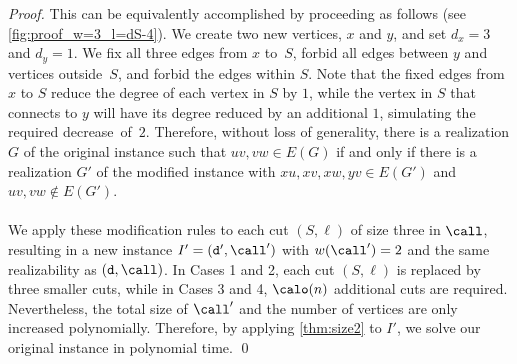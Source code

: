 \begin{proof}
    This can be equivalently accomplished by proceeding as follows (see \cref{fig:proof_w=3_l=dS-4}).
    We create two new vertices, $x$ and $y$, and set $d_x = 3$ and $d_y = 1$.
    We fix all three edges from $x$ to~$S$, forbid all edges between $y$ and vertices outside~$S$, and forbid the edges within $S$. Note that the fixed edges from $x$ to $S$ reduce the degree of each vertex in $S$ by $1$, while the vertex in $S$ that connects to $y$ will have its degree reduced by an additional $1$, simulating the required decrease~of~$2$.
    Therefore, without loss of generality, there is a realization $G$ of the original instance such that $uv, vw \in E(G)$ if and only if there is a realization $G'$ of the modified instance with $xu, xv, xw, yv \in E(G')$ and $uv, vw \notin E(G')$.

    \paragraph{}
    We apply these modification rules to each cut $(S, \ell)$ of size three in $\call$, resulting in a new instance $I'=(\texttt{d}', \call')$ with $w(\call') = 2$ and the same realizability as $(\texttt{d}, \call)$. In Cases 1 and 2, each cut $(S, \ell)$ is replaced by three smaller cuts, while in Cases 3 and 4, $\calo(n)$ additional cuts are required. Nevertheless, the total size of $\call'$ and the number of vertices are only increased polynomially. Therefore, by applying \cref{thm:size2} to $I'$, we solve our original instance in polynomial time.
    \qed
\end{proof}

